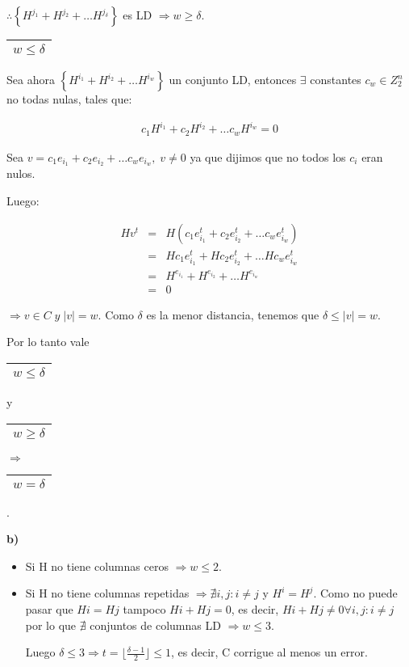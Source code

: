 \documentclass[12pt,a4paper]{report}
\newcounter{neq}
\begin{document}
		$\therefore \left\lbrace H^{j_{1}} + H^{j_{2}} + \dotsc H^{j_{\delta}} \right\rbrace$ es LD $\Rightarrow w \geq \delta$.
		
		\vspace{3mm}
		\begin{tabular}{|c|} \hline $w \leq \delta $ \\ \hline \end{tabular} Sea ahora $\left\lbrace H^{i_{1}} + H^{i_{2}} + \dotsc H^{i_{w}} \right\rbrace$ un conjunto LD, entonces $\exists$ constantes $c_{w} \in Z_{2}^{n}$ no todas nulas, tales que:
		
		\begin{eqnarray}
			\nonumber c_{1} H^{i_{1}} + c_{2} H^{i_{2}} + \dotsc c_{w} H^{i_{w}} = 0 
		\end{eqnarray}
		
		Sea $v = c_{1} e_{i_{1}} + c_{2} e_{i_{2}} + \dotsc c_{w} e_{i_{w}} , \; v \neq 0$ ya que dijimos que no todos los $c_{i}$ eran nulos.
		
		Luego:
		
		\begin{eqnarray}
			\nonumber H v^{t} &=& H (c_{1} e_{i_{1}}^{t} + c_{2} e_{i_{2}}^{t} + \dotsc c_{w} e_{i_{w}}^{t}) \\
			\nonumber &=& H c_{1} e_{i_{1}}^{t} + H c_{2} e_{i_{2}}^{t} + \dotsc H c_{w} e_{i_{w}}^{t} \\
			\nonumber &=& H^{e_{i_{1}}} + H^{e_{i_{2}}} + \dotsc H^{e_{i_{w}}} \\
			\nonumber &=& 0
		\end{eqnarray}
		
		$\Rightarrow v \in C \; y \; \lvert v \rvert = w$. Como $\delta$ es la menor distancia, tenemos que $\delta \leq \lvert v \rvert = w$. 
		
		\vspace{5mm}		
		Por lo tanto vale \begin{tabular}{|c|} \hline $w \leq \delta $ \\ \hline \end{tabular} y \begin{tabular}{|c|} \hline $w \geq \delta $ \\ \hline \end{tabular} $\Rightarrow$ \begin{tabular}{|c|} \hline $w = \delta $ \\ \hline \end{tabular}.
		
		\vspace{5mm}
		\textbf{b)}
		\begin{itemize}
			\item Si H no tiene columnas ceros $\Rightarrow w \leq 2$.
			\item Si H no tiene columnas repetidas $\Rightarrow \nexists i,j : i \neq j$ y $H^{i} = H^{j}$. Como no puede pasar que $H{i} = H{j}$ tampoco $H{i} + H{j} = 0$, es decir, $H{i} + H{j} \neq 0 \forall i,j : i \neq j$ por lo que $\nexists$ conjuntos de columnas LD $\Rightarrow w \leq 3$.
			
			Luego $\delta \leq 3 \Rightarrow t = \lfloor \frac{\delta-1}{2} \rfloor \leq 1$, es decir, C corrigue al menos un error.
		\end{itemize}
	
\end{document}
